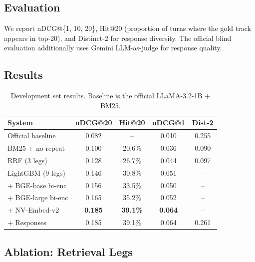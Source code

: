 \documentclass[sigconf]{acmart}
\begin{document}
\subsection{Evaluation}

We report nDCG@\{1, 10, 20\}, Hit@20 (proportion of turns where the gold track appears in top-20), and Distinct-2 for response diversity. The official blind evaluation additionally uses Gemini LLM-as-judge for response quality.

\subsection{Results}

\begin{table}[h]
\centering
\caption{Development set results. Baseline is the official LLaMA-3.2-1B + BM25.}
\label{tab:results}
\small
\setlength{\tabcolsep}{4pt}
\begin{tabular}{@{}lcccc@{}}
\toprule
System & nDCG@20 & Hit@20 & nDCG@1 & Dist-2 \\
\midrule
Official baseline & 0.082 & -- & 0.010 & 0.255 \\
BM25 + no-repeat & 0.100 & 20.6\% & 0.036 & 0.090 \\
RRF (3 legs) & 0.128 & 26.7\% & 0.044 & 0.097 \\
LightGBM (9 legs) & 0.146 & 30.8\% & 0.051 & -- \\
+ BGE-base bi-enc & 0.156 & 33.5\% & 0.050 & -- \\
+ BGE-large bi-enc & 0.165 & 35.2\% & 0.052 & -- \\
+ NV-Embed-v2 & \textbf{0.185} & \textbf{39.1\%} & \textbf{0.064} & -- \\
+ Responses & 0.185 & 39.1\% & 0.064 & 0.261 \\
\bottomrule
\end{tabular}
\end{table}

\subsection{Ablation: Retrieval Legs}
\end{document}
